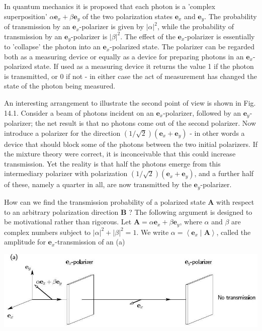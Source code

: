 \documentclass[10pt]{article}
\begin{document}
In quantum mechanics it is proposed that each photon is a 'complex superposition' $\alpha \mathbf{e}_{x}+\beta \mathbf{e}_{y}$ of the two polarization states $\mathbf{e}_{x}$ and $\mathbf{e}_{y}$. The probability of transmission by an $\mathbf{e}_{x}$-polarizer is given by $|\alpha|^{2}$, while the probability of transmission by an $\mathbf{e}_{y}$-polarizer is $|\beta|^{2}$. The effect of the $\mathbf{e}_{x}$-polarizer is essentially to 'collapse' the photon into an $\mathbf{e}_{x}$-polarized state. The polarizer can be regarded both as a measuring device or equally as a device for preparing photons in an $\mathbf{e}_{x}$-polarized state. If used as a measuring device it returns the value 1 if the photon is transmitted, or 0 if not - in either case the act of measurement has changed the state of the photon being measured.

An interesting arrangement to illustrate the second point of view is shown in Fig. 14.1. Consider a beam of photons incident on an $\mathbf{e}_{x}$-polarizer, followed by an $\mathbf{e}_{y}$-polarizer; the net result is that no photons come out of the second polarizer. Now introduce a polarizer for the direction $(1 / \sqrt{2})\left(\mathbf{e}_{x}+\mathbf{e}_{y}\right)$ - in other words a device that should block some of the photons between the two initial polarizers. If the mixture theory were correct, it is inconceivable that this could increase transmission. Yet the reality is that half the photons emerge from this intermediary polarizer with polarization $(1 / \sqrt{2})\left(\mathbf{e}_{x}+\mathbf{e}_{y}\right)$, and a further half of these, namely a quarter in all, are now transmitted by the $\mathbf{e}_{y}$-polarizer.

How can we find the transmission probability of a polarized state $\mathbf{A}$ with respect to an arbitrary polarization direction $\mathbf{B}$ ? The following argument is designed to be motivational rather than rigorous. Let $\mathbf{A}=\alpha \mathbf{e}_{x}+\beta \mathbf{e}_{y}$, where $\alpha$ and $\beta$ are complex numbers subject to $|\alpha|^{2}+|\beta|^{2}=1$. We write $\alpha=\left\langle\mathbf{e}_{x} \mid \mathbf{A}\right\rangle$, called the amplitude for $\mathbf{e}_{x}$-transmission of an
(a)

\begin{center}
\includegraphics[max width=\textwidth]{2023_12_20_5d48e1c38160b1e32b28g-03}
\end{center}
\end{document}
